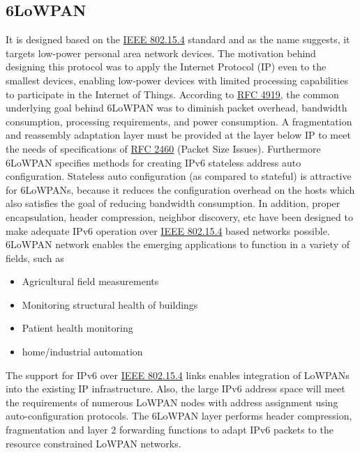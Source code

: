 \documentclass[10pt,journal,compsoc]{IEEEtran}
\begin{document}
	\subsection{\textbf{6LoWPAN}}

	It is designed based on the \href{https://standards.ieee.org/ieee/802.15.4/7029/}{IEEE 802.15.4}\cite{rfc8576}\cite{rfc4944} standard and as the name suggests, it targets low-power personal area network devices. The motivation behind designing this protocol was to apply the Internet Protocol (IP) even to the smallest devices, enabling low-power devices with limited processing capabilities to participate in the Internet of Things.
	According to \href{https://www.rfc-editor.org/info/rfc4919}{RFC 4919}, the common underlying goal behind 6LoWPAN was to diminish packet overhead,
	bandwidth consumption, processing requirements, and power
	consumption. A fragmentation and reassembly adaptation layer must
	be provided at the layer below IP to meet the needs of specifications of \href{https://www.rfc-editor.org/info/rfc2460}{RFC 2460} (Packet Size Issues)\cite{rfc4919}. Furthermore 6LoWPAN specifies methods for creating IPv6 stateless address auto configuration. Stateless
	auto configuration (as compared to stateful) is attractive for
	6LoWPANs, because it reduces the configuration overhead on the
	hosts which also satisfies the goal of reducing bandwidth consumption. In addition, proper encapsulation, header compression, neighbor discovery, etc have been designed to make adequate IPv6 operation over \href{https://standards.ieee.org/ieee/802.15.4/7029/}{IEEE 802.15.4} based networks possible.
	6LoWPAN network enables the emerging applications to function in a variety of fields, such as
	\begin{itemize}
		\item Agricultural field measurements
		\item Monitoring structural health of buildings
		\item Patient health monitoring
		\item home/industrial automation
	\end{itemize}
	\cite{rfc4919}The support for IPv6 over \href{https://standards.ieee.org/ieee/802.15.4/7029/}{IEEE 802.15.4} links enables integration of LoWPANs into the existing IP infrastructure. Also, the large IPv6 address space will meet the requirements of numerous LoWPAN nodes with address assignment using auto-configuration protocols. The 6LoWPAN layer performs header compression, fragmentation and layer 2 forwarding functions to adapt IPv6 packets to the resource constrained LoWPAN networks\cite{rfc4919}.
\end{document}
